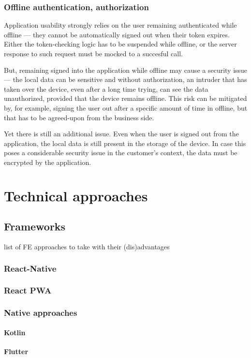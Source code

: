 \documentclass[
  digital,     %
  color,       %
  oneside,     %
  nosansbold,  %
  nocolorbold, %
  lof,         %
  lot,         %
]{fithesis4}
\begin{document}
\subsection{Offline authentication, authorization}
Application usability strongly relies on the user remaining authenticated while offline --- they cannot be automatically signed out when their token expires. Either the token-checking logic has to be suspended while offline, or the server response to such request must be mocked to a succesful call.

But, remaining signed into the application while offline may cause a security issue --- the local data can be sensitive and without authorization, an intruder that has taken over the device, even after a long time trying, can see the data unauthorized, provided that the device remains offline. This risk can be mitigated by, for example, signing the user out after a specific amount of time in offline, but that has to be agreed-upon from the business side. 

Yet there is still an additional issue. Even when the user is signed out from the application, the local data is still present in the storage of the device. In case this poses a considerable security issue in the customer's context, the data must be encrypted by the application.

\chapter{Technical approaches}

\section{Frameworks}
list of FE approaches to take with their (dis)advantages
\subsection{React-Native}
\subsection{React PWA}
\subsection{Native approaches}
\subsubsection{Kotlin}
\subsubsection{Flutter}
\end{document}

